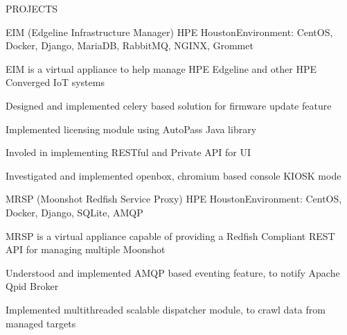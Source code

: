 \documentclass{resume} %
\begin{document}
\begin{rSection}{PROJECTS}


\begin{rSubsection}{EIM (Edgeline Infrastructure Manager)}
{HPE Houston}{Environment: CentOS, Docker, Django,  MariaDB, RabbitMQ, NGINX, Grommet}{ }  %

\vspace{-3pt}

\item EIM is a virtual appliance to help manage HPE Edgeline and other HPE Converged IoT systems
\item Designed and implemented celery based solution for firmware update feature
\item Implemented licensing module using AutoPass Java library
\item Involed in implementing RESTful and Private API for UI
\item Investigated and implemented openbox, chromium based console KIOSK mode

\end{rSubsection}


\begin{rSubsection}{MRSP (Moonshot Redfish Service Proxy)}
{HPE Houston}{Environment: CentOS, Docker, Django,  SQLite, AMQP}{ }  %

\vspace{-3pt}

\item MRSP is a virtual appliance capable of providing a Redfish Compliant REST API for managing multiple Moonshot
\item Understood and implemented AMQP based eventing feature, to notify Apache Qpid Broker
\item Implemented multithreaded scalable dispatcher module, to crawl data from managed targets

\end{rSubsection}


\end{rSection}
\end{document}
